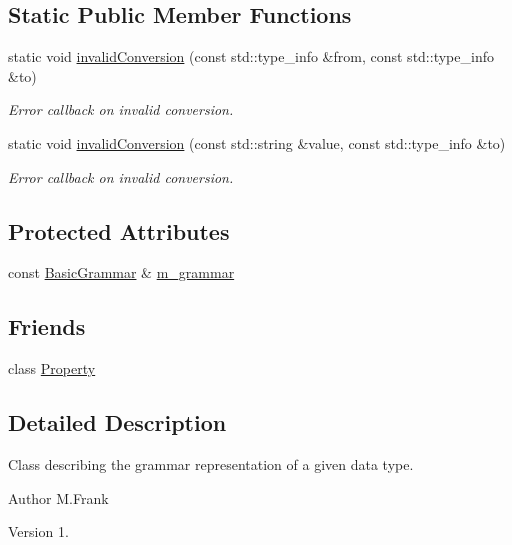 \subsection*{Static Public Member Functions}
\begin{DoxyCompactItemize}
\item 
static void \hyperlink{class_d_d4hep_1_1_property_grammar_ac36bdd6df04d3f26daff768377e1583a}{invalid\+Conversion} (const std\+::type\+\_\+info \&from, const std\+::type\+\_\+info \&to)
\begin{DoxyCompactList}\small\item\em Error callback on invalid conversion. \end{DoxyCompactList}\item 
static void \hyperlink{class_d_d4hep_1_1_property_grammar_af0a4553e93979108dd872da16091e206}{invalid\+Conversion} (const std\+::string \&value, const std\+::type\+\_\+info \&to)
\begin{DoxyCompactList}\small\item\em Error callback on invalid conversion. \end{DoxyCompactList}\end{DoxyCompactItemize}
\subsection*{Protected Attributes}
\begin{DoxyCompactItemize}
\item 
const \hyperlink{class_d_d4hep_1_1_basic_grammar}{Basic\+Grammar} \& \hyperlink{class_d_d4hep_1_1_property_grammar_a49c47d61452e560f0186eef943cf711e}{m\+\_\+grammar}
\end{DoxyCompactItemize}
\subsection*{Friends}
\begin{DoxyCompactItemize}
\item 
class \hyperlink{class_d_d4hep_1_1_property_grammar_a386f5a9cf65610cb62143865e5637272}{Property}
\end{DoxyCompactItemize}


\subsection{Detailed Description}
Class describing the grammar representation of a given data type. 

\begin{DoxyAuthor}{Author}
M.\+Frank 
\end{DoxyAuthor}
\begin{DoxyVersion}{Version}
1. 
\end{DoxyVersion}



